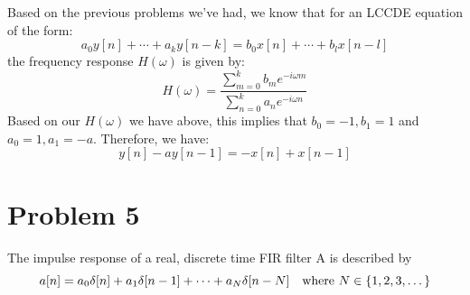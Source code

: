 \documentclass[10pt]{article}
\begin{document}
\begin{enumerate}[label=\alph*)]
			\begin{solution}
				Based on the previous problems we've had, we know that for an LCCDE equation of the form:
				\[
					a_0y[n] + \cdots + a_ky[n - k] = b_0x[n] + \cdots + b_l x[n - l]
				\] 
				the frequency response \( H(\omega) \) is given by:
				\[
				H(\omega) = \frac{\sum_{m=0}^{k} b_m e^{-i \omega m}}{\sum_{n=0}^{k} a_n e^{-i \omega n}}
				\] 
				Based on our \( H(\omega)  \) we have above, this implies that \( b_0 = -1, b_1 = 1 \) and 
				\( a_0 = 1, a_1 = -a \). Therefore, we have:
				\[
					y[n] - ay[n - 1] = -x[n] + x[n - 1]
				\] 
			\end{solution}
	\end{enumerate}
	\pagebreak
	\section*{Problem 5}
	The impulse response of a real, discrete time FIR filter A is described by
	\[
		a[n] = a_0\delta[n] + a_1\delta[n - 1] + \cdots + a_N \delta[n - N] \quad \text{where \( N \in 
		\{1, 2, 3, \dots\} \)}
	\] 
\end{document}
